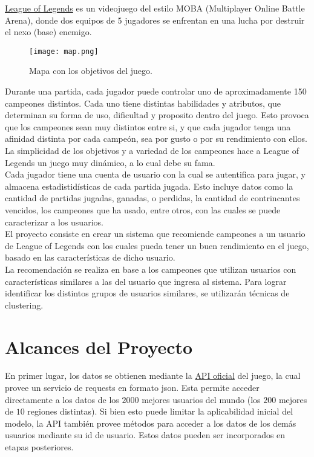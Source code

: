 \documentclass[letterpaper,11pt, spanish]{article}
\begin{document}
\href{las.leagueoflegends.com}{League of Legends} es un videojuego del estilo MOBA (Multiplayer Online Battle Arena),
donde dos equipos de 5 jugadores se enfrentan en una lucha por destruir el nexo
(base) enemigo. \\

\begin{figure}[h]
	\begin{center}
		\texttt{[image: map.png]}
	\end{center}
	\caption{Mapa con los objetivos del juego.}
\end{figure}

Durante una partida, cada jugador puede controlar uno de aproximadamente 150 campeones
distintos. Cada uno tiene distintas habilidades y atributos, que determinan
su forma de uso, dificultad y proposito dentro del juego. Esto provoca que
los campeones sean muy distintos entre si, y que cada jugador tenga una afinidad
distinta por cada campeón, sea por gusto o por su rendimiento con ellos. La simplicidad
de los objetivos y a variedad de los campeones hace a League of Legends un juego
muy dinámico, a lo cual debe su fama. \\

Cada jugador tiene una cuenta de usuario con la cual se autentifica para jugar, y
almacena estadistidísticas de cada partida jugada. Esto incluye datos como
la cantidad de partidas jugadas, ganadas, o perdidas, la cantidad de contrincantes vencidos,
los campeones que ha usado, entre otros, con las cuales se puede caracterizar a
los usuarios. \\

El proyecto consiste en crear un sistema que recomiende campeones a un usuario de
League of Legends con los cuales pueda tener un buen rendimiento en el juego,
basado en las características de dicho usuario. \\

La recomendación se realiza en base a los campeones que utilizan usuarios con
características similares a las del usuario que ingresa al sistema. Para lograr
identificar los distintos grupos de usuarios similares, se utilizarán técnicas
de clustering. \\

\section{Alcances del Proyecto}

En primer lugar, los datos se obtienen mediante la \href{https://developer.riotgames.com/}{API oficial}
del juego, la cual provee un servicio de requests en formato json. Esta permite
acceder directamente a los datos de los $2000$ mejores usuarios del mundo (los $200$
mejores de $10$ regiones distintas). Si bien esto puede limitar la aplicabilidad
inicial del modelo, la API también provee métodos para acceder a los datos de los
demás usuarios mediante su id de usuario. Estos datos pueden ser incorporados
en etapas posteriores. \\
\end{document}

